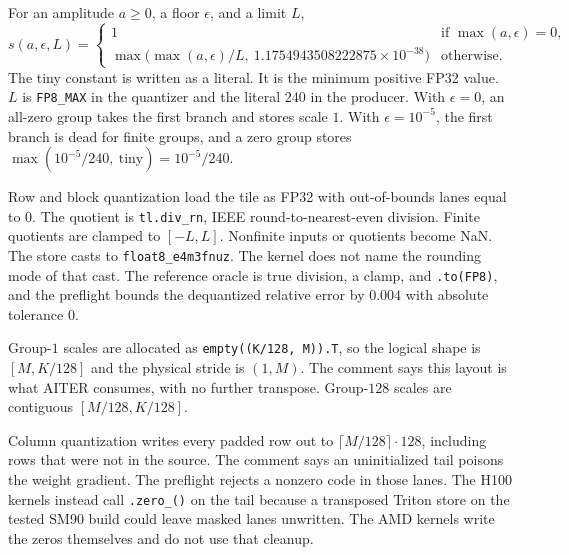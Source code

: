 \documentclass[11pt]{article}
\DeclareRobustCommand{\code}[1]{\texttt{#1}}
\begin{document}
For an amplitude \(a\ge 0\), a floor \(\epsilon\), and a limit \(L\),
\begin{equation}
\label{eq:scale}
s(a,\epsilon,L)
 =
 \begin{cases}
 1 & \text{if }\max(a,\epsilon)=0,\\
 \max\!\big(\max(a,\epsilon)/L,\ 1.1754943508222875\times 10^{-38}\big)
   & \text{otherwise.}
 \end{cases}
\end{equation}
The tiny constant is written as a literal. It is the minimum positive FP32
value. \(L\) is \code{FP8\_MAX} in the quantizer and the literal \(240\) in
the producer. With \(\epsilon=0\), an all-zero group takes the first branch
and stores scale \(1\). With \(\epsilon=10^{-5}\), the first branch is dead
for finite groups, and a zero group stores
\(\max(10^{-5}/240,\ \mathrm{tiny})=10^{-5}/240\).

Row and block quantization load the tile as FP32 with out-of-bounds lanes
equal to \(0\). The quotient is \code{tl.div\_rn}, IEEE round-to-nearest-even
division. Finite quotients are clamped to \([-L,L]\). Nonfinite inputs or
quotients become NaN. The store casts to \code{float8\_e4m3fnuz}. The kernel
does not name the rounding mode of that cast. The reference oracle is true
division, a clamp, and \code{.to(FP8)}, and the preflight bounds the
dequantized relative error by \(0.004\) with absolute tolerance \(0\).

Group-\(1\) scales are allocated as \code{empty((K/128, M)).T}, so the
logical shape is \([M,K/128]\) and the physical stride is \((1,M)\). The
comment says this layout is what AITER consumes, with no further transpose.
Group-\(128\) scales are contiguous \([M/128,K/128]\).

Column quantization writes every padded row out to
\(\lceil M/128\rceil\cdot 128\), including rows that were not in the source.
The comment says an uninitialized tail poisons the weight gradient. The
preflight rejects a nonzero code in those lanes. The H100 kernels instead
call \code{.zero\_()} on the tail because a transposed Triton store on the
tested SM90 build could leave masked lanes unwritten. The AMD kernels write
the zeros themselves and do not use that cleanup.
\end{document}
